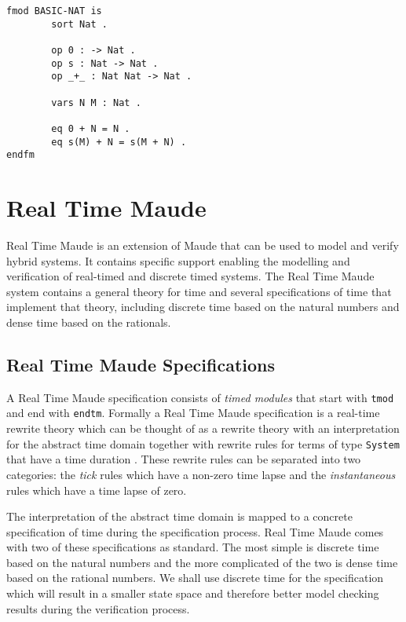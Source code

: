 \begin{lstlisting}[caption = The natural numbers in Maude, label = code:natnum]
fmod BASIC-NAT is
        sort Nat .

        op 0 : -> Nat .
        op s : Nat -> Nat .
        op _+_ : Nat Nat -> Nat .

        vars N M : Nat .

        eq 0 + N = N .
        eq s(M) + N = s(M + N) .
endfm
\end{lstlisting}



\section{Real Time Maude}
Real Time Maude is an extension of Maude that can be used to model and verify hybrid systems. It contains specific support enabling the modelling and verification of real-timed and discrete timed systems. 
The Real Time Maude system contains a general theory for time and several specifications of time that implement that theory, including discrete time based on the natural numbers and dense time based on the rationals.

\subsection{Real Time Maude Specifications}
A Real Time Maude specification consists of \emph{timed modules} that start with \texttt{tmod} and end with \texttt{endtm}. Formally a Real Time Maude specification is a real-time rewrite theory which can be thought of as a rewrite theory with an interpretation for the abstract time domain together with rewrite rules for terms of type \texttt{System} that have a time duration \cite{PO02}. These rewrite rules can be separated into two categories: the \emph{tick} rules which have a non-zero time lapse and the \emph{instantaneous} rules which have a time lapse of zero.

The interpretation of the abstract time domain is mapped to a concrete specification of time during the specification process. Real Time Maude comes with two of these specifications as standard. The most simple  is discrete time based on the natural numbers and the more complicated of the two is dense time based on the rational numbers. We shall use discrete time for the specification which will result in a smaller state space and therefore better model checking results during the verification process.
\medskip

